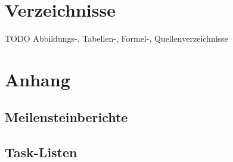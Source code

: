 \documentclass[a4paper]{report}
\begin{document}
\chapter{Verzeichnisse}
TODO Abbildungs-, Tabellen-, Formel-, Quellenverzeichnisse
\printbibliography

\chapter{Anhang}
\section{Meilensteinberichte}

\section{Task-Listen}
\end{document}
